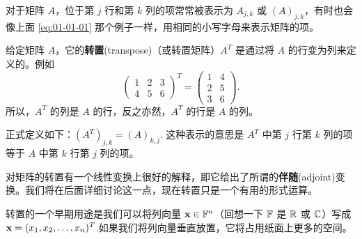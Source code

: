 对于矩阵 $A$，位于第 $j$ 行和第 $k$ 列的项常常被表示为 $A_{j,k}$ 或 $(A)_{j,k}$，有时也会像上面 \eqref{eq:01-01-01} 那个例子一样，用相同的小写字母来表示矩阵的项。

给定矩阵 $A$，它的\textbf{转置}(transpose)（或转置矩阵）$A^T$ 是通过将 $A$ 的行变为列来定义的。例如
$$
\begin{pmatrix} 1 & 2 & 3 \\ 4 & 5 & 6 \end{pmatrix}^T = \begin{pmatrix} 1 & 4 \\ 2 & 5 \\ 3 & 6 \end{pmatrix}.
$$
所以，$A^T$ 的列是 $A$ 的行，反之亦然，$A^T$ 的行是 $A$ 的列。

正式定义如下：$(A^T)_{j,k} = (A)_{k,j}.$ 这种表示的意思是 $A^T$ 中第 $j$ 行第 $k$ 列的项等于 $A$ 中第 $k$ 行第 $j$ 列的项。

对矩阵的转置有一个线性变换上很好的解释，即它给出了所谓的\textbf{伴随}(adjoint)变换。我们将在后面详细讨论这一点，现在转置只是一个有用的形式运算。

转置的一个早期用途是我们可以将列向量 $\mathbf{x} \in \mathbb{F}^n$（回想一下 $\mathbb{F}$ 是 $\mathbb{R}$ 或 $\mathbb{C}$）写成 $\mathbf{x} = (x_1, x_2, \dots, x_n)^T$.如果我们将列向量垂直放置，它将占用纸面上更多的空间。

